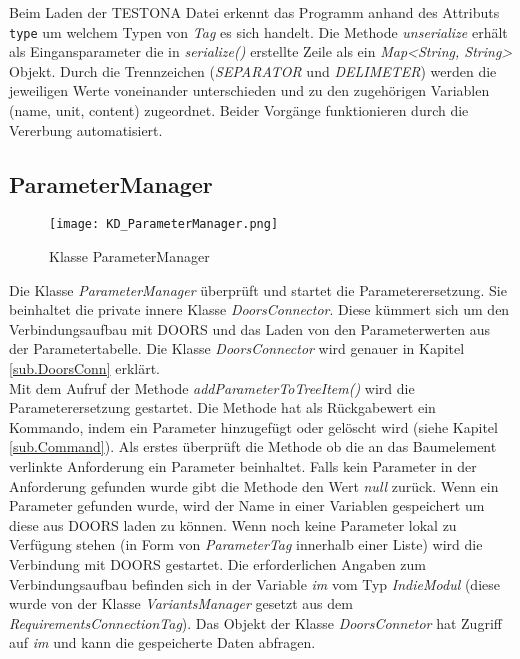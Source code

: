 Beim Laden der TESTONA Datei erkennt das Programm anhand des Attributs \texttt{type} um welchem Typen von \textit{Tag} es sich handelt. Die Methode \textit{unserialize} erhält als Eingansparameter die in \textit{serialize()} erstellte Zeile als ein \textit{Map<String, String>} Objekt. Durch die Trennzeichen (\textit{SEPARATOR} und \textit{DELIMETER}) werden die jeweiligen Werte voneinander unterschieden und zu den zugehörigen Variablen (name, unit, content) zugeordnet. Beider Vorgänge funktionieren durch die Vererbung automatisiert.

\subsection{ParameterManager}\label{sub:ParameterManager}

\begin{figure}[h]
  \begin{center}
    \texttt{[image: KD\_ParameterManager.png]}
  		  \caption{Klasse ParameterManager}
     \label{kd.ParameterMananger}
  \end{center}
\end{figure}

Die Klasse \textit{ParameterManager} überprüft und startet die Parameterersetzung. Sie beinhaltet die private innere Klasse \textit{DoorsConnector}. Diese kümmert sich um den Verbindungsaufbau mit DOORS und das Laden von den Parameterwerten aus der Parametertabelle. Die Klasse \textit{DoorsConnector} wird genauer in Kapitel \ref{sub.DoorsConn} erklärt.\\


Mit dem Aufruf der Methode \textit{addParameterToTreeItem()} wird die Parameterersetzung gestartet. Die Methode hat als Rückgabewert ein Kommando, indem ein Parameter hinzugefügt oder gelöscht wird (siehe Kapitel \ref{sub.Command}). Als erstes überprüft die Methode ob die an das Baumelement verlinkte Anforderung ein Parameter beinhaltet. Falls kein Parameter in der Anforderung gefunden wurde gibt die Methode den Wert \textit{null} zurück. Wenn ein Parameter gefunden wurde, wird der Name in einer Variablen gespeichert um diese aus DOORS laden zu können. Wenn noch keine Parameter lokal zu Verfügung stehen (in Form von \textit{ParameterTag} innerhalb einer Liste) wird die Verbindung mit DOORS gestartet. Die erforderlichen Angaben zum Verbindungsaufbau befinden sich in der Variable \textit{im} vom Typ \textit{IndieModul} (diese wurde von der Klasse \textit{VariantsManager} gesetzt aus dem \textit{RequirementsConnectionTag}). Das Objekt der Klasse \textit{DoorsConnetor} hat Zugriff auf \textit{im} und kann die gespeicherte Daten abfragen.\\


